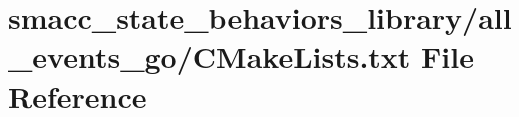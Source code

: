 \hypertarget{state__behaviors__library_2all__events__go_2CMakeLists_8txt}{}\section{smacc\+\_\+state\+\_\+behaviors\+\_\+library/all\+\_\+events\+\_\+go/\+C\+Make\+Lists.txt File Reference}
\label{state__behaviors__library_2all__events__go_2CMakeLists_8txt}
